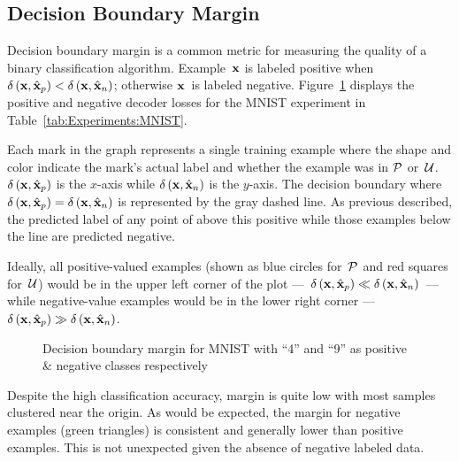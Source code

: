 \subsection{Decision Boundary Margin}\label{sec:Experiments:Margin}

Decision boundary margin is a common metric for measuring the quality of a binary classification algorithm. Example~$\mathbf{x}$ is labeled positive when ${\delta\left(\mathbf{x}, \hat{\mathbf{x}}_{p}\right)<\delta\left(\mathbf{x}, \hat{\mathbf{x}}_{n}\right)}$; otherwise $\mathbf{x}$~is labeled negative. Figure~\ref{fig:Experiments:UnlabelPlot} displays the positive and negative decoder losses for the MNIST experiment in Table~\ref{tab:Experiments:MNIST}.

Each mark in the graph represents a single training example where the shape and color indicate the mark's actual label and whether the example was in $\mathcal{P}$ or~$\mathcal{U}$. $\delta\left(\mathbf{x}, \hat{\mathbf{x}}_{p}\right)$ is the $x$-axis while $\delta\left(\mathbf{x}, \hat{\mathbf{x}}_{n}\right)$ is the $y$-axis. The decision boundary where ${\delta\left(\mathbf{x}, \hat{\mathbf{x}}_{p}\right)=\delta\left(\mathbf{x}, \hat{\mathbf{x}}_{n}\right)}$ is represented by the gray dashed line.  As previous described, the predicted label of any point of above this positive while those examples below the line are predicted negative.

Ideally, all positive-valued examples (shown as blue circles for~$\mathcal{P}$ and red squares for~$\mathcal{U}$) would be in the upper left corner of the plot ---~${\delta\left(\mathbf{x}, \hat{\mathbf{x}}_{p}\right)\ll\delta\left(\mathbf{x}, \hat{\mathbf{x}}_{n}\right)}$~--- while negative-value examples would be in the lower right corner ---~${\delta\left(\mathbf{x}, \hat{\mathbf{x}}_{p}\right)\gg\delta\left(\mathbf{x}, \hat{\mathbf{x}}_{n}\right)}$.

\begin{figure}[t]
  \centering
  
  \caption{Decision boundary margin for MNIST with ``4'' and ``9'' as positive \& negative classes respectively}\label{fig:Experiments:UnlabelPlot}
\end{figure}

Despite the high classification accuracy, margin is quite low with most samples clustered near the origin.  As would be expected, the margin for negative examples (green triangles) is consistent and generally lower than positive examples.  This is not unexpected given the absence of negative labeled data.

